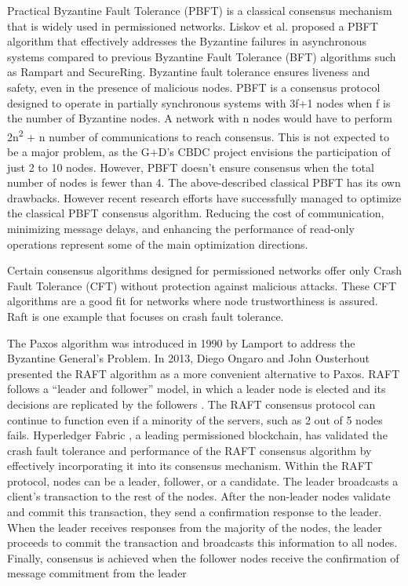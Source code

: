 \documentclass[
  english,        %
  font=times,     %
  onecolumn,      %
]{tumarticle}
\begin{document}
\hspace{1em} Practical Byzantine Fault Tolerance (PBFT) is a classical consensus mechanism that is widely used in permissioned networks. Liskov et al.\cite{castro1999practical} proposed a PBFT algorithm that effectively addresses the Byzantine failures in asynchronous systems compared to previous Byzantine Fault Tolerance (BFT) algorithms such as Rampart and SecureRing. Byzantine fault tolerance ensures liveness and safety, even in the presence of malicious nodes. PBFT is a consensus protocol designed to operate in partially synchronous systems with 3f+1 nodes when f is the number of Byzantine nodes. A network with n nodes would have to perform 2n\textsuperscript{2} + n number of communications to reach consensus. This is not expected to be a major problem,  as the G+D's CBDC project envisions the participation of just 2 to 10 nodes. However, PBFT doesn't ensure consensus when the total number of nodes is fewer than 4. The above-described classical PBFT has its own drawbacks. However recent research efforts have successfully managed to optimize the classical PBFT consensus algorithm. Reducing the cost of communication, minimizing message delays, and enhancing the performance of read-only operations represent some of the main optimization directions.

\hspace{1em} Certain consensus algorithms designed for permissioned networks offer only Crash Fault Tolerance (CFT) without protection against malicious attacks. These CFT algorithms are a good fit for networks where node trustworthiness is assured. Raft is one example that focuses on crash fault tolerance.

\hspace{1em} The Paxos algorithm \cite{lamport2019part} was introduced in 1990 by Lamport to address the Byzantine General's Problem. In 2013,  Diego Ongaro and John Ousterhout \cite{ongaro2014search} presented the RAFT algorithm as a more convenient alternative to Paxos. RAFT follows a “leader and follower” model, in which a leader node is elected and its decisions are replicated by the followers \cite{hyperledger}. The RAFT consensus protocol can continue to function even if a minority of the servers, such as 2 out of 5 nodes fails. Hyperledger Fabric \cite{hyperledger}, a leading permissioned blockchain, has validated the crash fault tolerance and performance of the RAFT consensus algorithm by effectively incorporating it into its consensus mechanism. Within the RAFT protocol, nodes can be a leader, follower, or a candidate. The leader broadcasts a client’s  transaction to the rest of the nodes. After the non-leader nodes validate and commit this transaction, they send a confirmation response to the leader.  When the leader receives responses from the majority of the nodes, the leader proceeds to commit the transaction and broadcasts this information to all nodes. Finally, consensus is achieved when the follower nodes receive the confirmation of message commitment from the leader 
\end{document}

